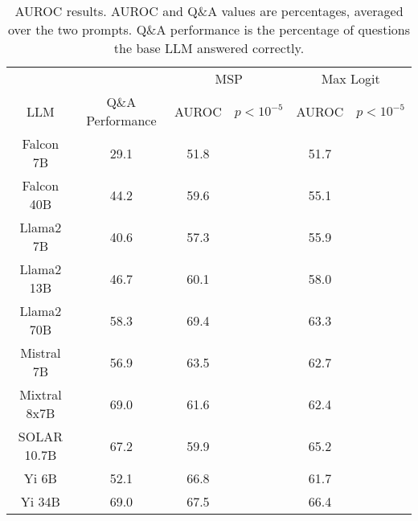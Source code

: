 \begin{table*}
\centering
\begin{tabular}{c|c|c|c|c|c}
& & \multicolumn{2}{c|}{MSP} & \multicolumn{2}{c}{Max Logit} \\ 
LLM & Q\&A Performance & AUROC & $p < 10^{-5}$ & AUROC & $p < 10^{-5}$\\ \hline
Falcon 7B & 29.1 & 51.8 &  & 51.7 & \\
Falcon 40B & 44.2 & 59.6 &  & 55.1 & \\
Llama2 7B & 40.6 & 57.3 &  & 55.9 & \\
Llama2 13B & 46.7 & 60.1 &  & 58.0 & \\
Llama2 70B & 58.3 & 69.4 &  & 63.3 & \\
Mistral 7B & 56.9 & 63.5 &  & 62.7 & \\
Mixtral 8x7B & 69.0 & 61.6 &  & 62.4 & \\
SOLAR 10.7B & 67.2 & 59.9 &  & 65.2 & \\
Yi 6B & 52.1 & 66.8 &  & 61.7 & \\
Yi 34B & 69.0 & 67.5 &  & 66.4 & \\
\hline
\end{tabular}
\caption{AUROC results. AUROC and Q\&A values are percentages, averaged over the two prompts. Q\&A performance is the percentage of questions the base LLM answered correctly.}
\label{tab:auroc}
\end{table*}
